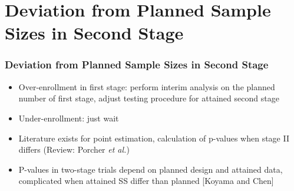\documentclass{beamer}\usepackage[]{graphicx}\usepackage[]{color}
\begin{document}
\section{Deviation from Planned Sample Sizes in Second Stage}

\begin{frame}
\frametitle{Deviation from Planned Sample Sizes in Second Stage}
    \begin{itemize}
        \item Over-enrollment in first stage: perform interim analysis on the planned number of first stage, adjust testing procedure for attained second stage %
        \item Under-enrollment: just wait
        \item Literature exists for point estimation, calculation of p-values when stage II differs (Review: Porcher \textit{et al.})
        \item P-values in two-stage trials depend on planned design and attained data, complicated when attained SS differ than planned [Koyama and Chen] %
    \end{itemize}
\end{frame}
\end{document}
